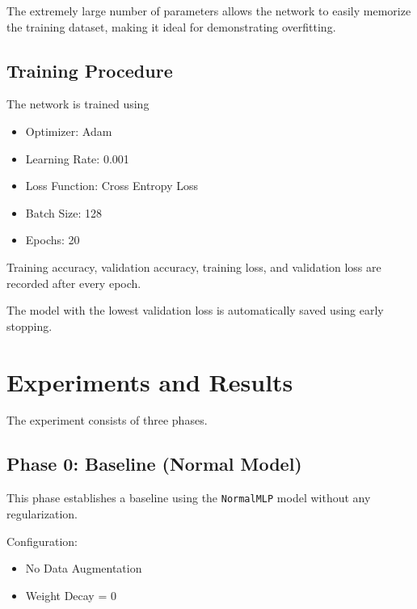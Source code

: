 \documentclass[12pt]{article}
\begin{document}
The extremely large number of parameters allows the network to easily memorize the training dataset, making it ideal for demonstrating overfitting.


\subsection{Training Procedure}

The network is trained using

\begin{itemize}

\item Optimizer: Adam

\item Learning Rate: 0.001

\item Loss Function: Cross Entropy Loss

\item Batch Size: 128

\item Epochs: 20

\end{itemize}

Training accuracy, validation accuracy, training loss, and validation loss are recorded after every epoch.

The model with the lowest validation loss is automatically saved using early stopping.


\section{Experiments and Results}

The experiment consists of three phases.


\subsection{Phase 0: Baseline (Normal Model)}

This phase establishes a baseline using the \texttt{NormalMLP} model without any regularization.

Configuration:

\begin{itemize}
\item No Data Augmentation
\item Weight Decay = 0
\end{itemize}
\end{document}
